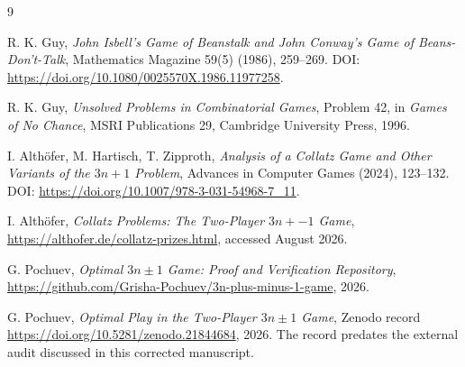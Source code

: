 \documentclass[11pt]{article}
\begin{document}
\begin{thebibliography}{9}

R. K. Guy,
\emph{John Isbell's Game of Beanstalk and John Conway's Game of Beans-Don't-Talk},
Mathematics Magazine 59(5) (1986), 259--269.
DOI: \url{https://doi.org/10.1080/0025570X.1986.11977258}.

R. K. Guy,
\emph{Unsolved Problems in Combinatorial Games}, Problem 42,
in \emph{Games of No Chance}, MSRI Publications 29, Cambridge University
Press, 1996.

I. Alth\"ofer, M. Hartisch, T. Zipproth,
\emph{Analysis of a Collatz Game and Other Variants of the $3n+1$ Problem},
Advances in Computer Games (2024), 123--132.
DOI: \url{https://doi.org/10.1007/978-3-031-54968-7_11}.

I. Alth\"ofer,
\emph{Collatz Problems: The Two-Player $3n{+}{-}1$ Game},
\url{https://althofer.de/collatz-prizes.html}, accessed August 2026.

G. Pochuev,
\emph{Optimal $3n\mathbin{\pm}1$ Game: Proof and Verification Repository},
\url{https://github.com/Grisha-Pochuev/3n-plus-minus-1-game}, 2026.

G. Pochuev,
\emph{Optimal Play in the Two-Player $3n\mathbin{\pm}1$ Game},
Zenodo record \url{https://doi.org/10.5281/zenodo.21844684}, 2026.
The record predates the external audit discussed in this corrected manuscript.

\end{thebibliography}
\end{document}
